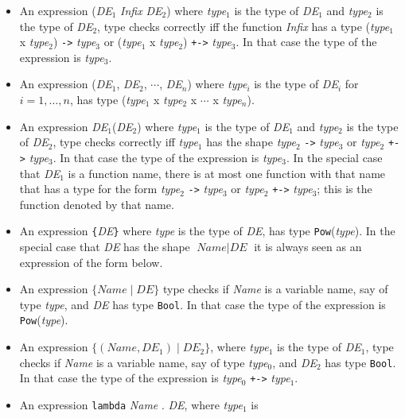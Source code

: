 \documentclass[adraft]{eptcs}
\newcommand{\aac}[1]{{\tt #1}}    %
\begin{document}
\begin{enumerate}
\begin{itemize}
  \item An expression  (\textit{DE}$_1$ \textit{Infix} \textit{DE}$_2$) where \textit{type}$_1$ is
    the type of \textit{DE}$_1$ and \textit{type}$_2$ is the type of \textit{DE}$_2$, type checks
    correctly iff the function \textit{Infix} has a type
    (\textit{type}$_1$ x \textit{type}$_2$) {\tt ->} \textit{type}$_3$ or
    (\textit{type}$_1$ x \textit{type}$_2$) {\tt +->} \textit{type}$_3$.
    In that case the type of the expression is \textit{type}$_3$.
  \item An expression  (\textit{DE}$_1$, \textit{DE}$_2$, $\cdots $, \textit{DE}$_n$) where \textit{type}$_i$ is
    the type of \textit{DE}$_i$ for $i=1,\dots,n$, has type
    (\textit{type}$_1$ x \textit{type}$_2$ x $\cdots$ x \textit{type}$_n$).
  \item An expression  \textit{DE}$_1$(\textit{DE}$_2$) where \textit{type}$_1$ is
    the type of \textit{DE}$_1$ and \textit{type}$_2$ is the type of \textit{DE}$_2$, type checks
    correctly iff \textit{type}$_1$ has the shape \textit{type}$_2$ {\tt ->} \textit{type}$_3$ or
    \textit{type}$_2$ {\tt +->} \textit{type}$_3$.
    In that case the type of the expression is \textit{type}$_3$.
    In the special case that \textit{DE}$_1$ is a function name, there is at most one function with
    that name that has a type for the form \textit{type}$_2$ {\tt ->} \textit{type}$_3$ or \textit{type}$_2$ {\tt +->} \textit{type}$_3$;
    this is the function denoted by that name.
  \item An expression  {\tt \{}\textit{DE}{\tt \}} where \textit{type} is
    the type of \textit{DE}, has type \aac{Pow}(\textit{type}).
    In the special case that \textit{DE} has the shape $\textit{Name}\mid \textit{DE}$ it is always
    seen as an expression of the form below.
  \item An expression $\{\textit{Name}\mid \textit{DE}\}$ type checks if \textit{Name} is a variable
    name, say of type \textit{type}, and \textit{DE} has type {\tt Bool}.
    In that case the type of the expression is \aac{Pow}(\textit{type}).
  \item An expression $\{(\textit{Name}, \textit{DE}_1) \mid \textit{DE}_2\}$, where \textit{type}$_1$ is
    the type of \textit{DE}$_1$, type checks if \textit{Name} is a variable name, say of type
    \textit{type}$_0$, and \textit{DE}$_2$ has type {\tt Bool}. 
    In that case the type of the expression is \textit{type}$_0$ {\tt +->} \textit{type}$_1$.
  \item An expression \aac{lambda} \textit{Name} . \textit{DE}, where \textit{type}$_1$ is

\end{itemize}
\end{enumerate}
\end{document}
